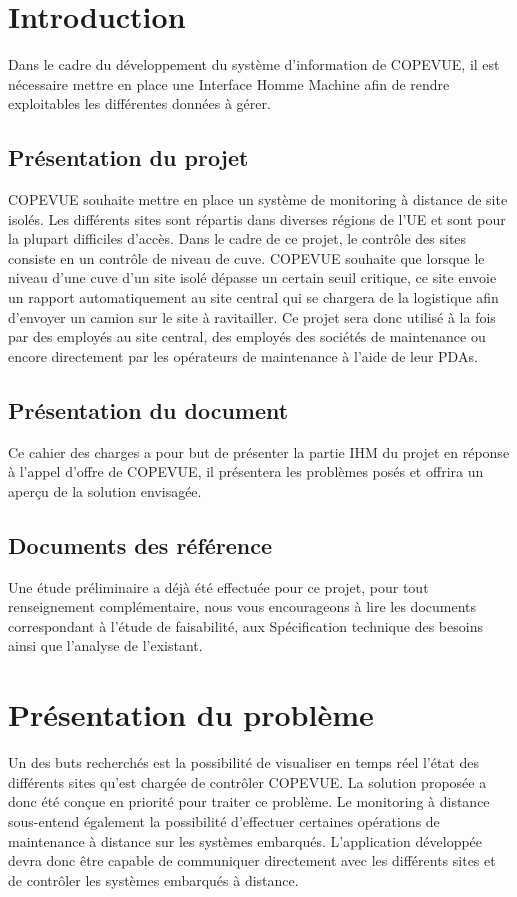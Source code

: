 \newpage
\section{Introduction}
Dans le cadre du développement du système d'information de COPEVUE, il est nécessaire mettre en place une Interface Homme Machine afin de rendre exploitables les différentes données à gérer.
\subsection{Présentation du projet}
COPEVUE souhaite mettre en place un système de monitoring à distance de site isolés. Les différents sites sont répartis dans diverses régions de l'UE et sont pour la plupart difficiles d'accès. Dans le cadre de ce projet, le contrôle des sites consiste en un contrôle de niveau de cuve. COPEVUE souhaite que lorsque le niveau d'une cuve d'un site isolé dépasse un certain seuil critique, ce site envoie un rapport automatiquement au site central qui se chargera de la logistique afin d'envoyer un camion sur le site à ravitailler. Ce projet sera donc utilisé à la fois par des employés au site central, des employés des sociétés de maintenance ou encore directement par les opérateurs de maintenance à l'aide de leur PDAs.

\subsection{Présentation du document}
Ce cahier des charges a pour but de présenter la partie IHM du projet en réponse à l'appel d'offre de COPEVUE, il présentera les problèmes posés et offrira un aperçu de la solution envisagée.
\subsection{Documents des référence}
Une étude préliminaire a déjà été effectuée pour ce projet, pour tout renseignement complémentaire, nous vous encourageons à lire les documents correspondant à l'étude de faisabilité, aux Spécification technique des besoins ainsi que l'analyse de l'existant.

\section{Présentation du problème}
Un des buts recherchés est la possibilité de visualiser en temps réel l'état des différents sites qu'est chargée de contrôler COPEVUE. La solution proposée a donc été conçue en priorité pour traiter ce problème. Le monitoring à distance sous-entend également la possibilité d'effectuer certaines opérations de maintenance à distance sur les systèmes embarqués. L'application développée devra donc être capable de communiquer directement avec les différents sites et de contrôler les systèmes embarqués à distance.


